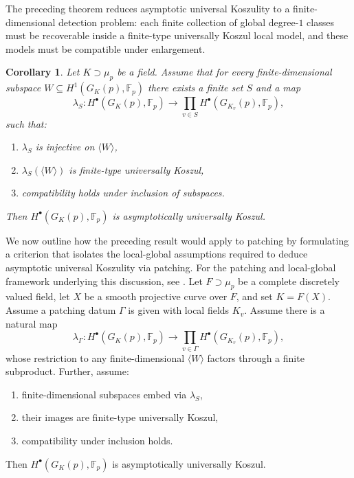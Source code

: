 \documentclass[11pt]{amsart}
\numberwithin{equation}{section}
\newtheorem{corollary}[theorem]{Corollary}
\theoremstyle{definition}
\begin{document}
	
	The preceding theorem reduces asymptotic universal Koszulity to a finite-dimensional detection problem: each finite collection of global degree-$1$ classes must be recoverable inside a finite-type universally Koszul local model, and these models must be compatible under enlargement.
	
	
	
	\begin{corollary}
		\label{cor:finite-local-product-descent}
		Let $K \supset \mu_p$ be a field. Assume that for every finite-dimensional subspace $W \subseteq H^1(G_K(p),\mathbb{F}_p)$ there exists a finite set $S$ and a map
		\[\lambda_S \colon H^\bullet(G_K(p),\mathbb{F}_p) \longrightarrow \prod_{v\in S} H^\bullet(G_{K_v}(p),\mathbb{F}_p),\]
		such that:
		\begin{enumerate}[label=(\roman*)]
			\item $\lambda_S$ is injective on $\langle W\rangle$,
			\item $\lambda_S(\langle W\rangle)$ is finite-type universally Koszul,
			\item compatibility holds under inclusion of subspaces.
		\end{enumerate}
		Then $H^\bullet(G_K(p),\mathbb F_p)$ is asymptotically universally Koszul.
	\end{corollary}
	
	We now outline how the preceding result would apply to patching by formulating a criterion that isolates the local-global assumptions required to deduce asymptotic universal Koszulity via patching. For the patching and local-global framework underlying this discussion, see \cite{HarbaterHartmannKrashenLGG,HarbaterHartmannKrashenLGcohom,HarbaterHartmannPatching}. Let $F\supset \mu_p $ be a complete discretely valued field, let $X$ be a smooth projective curve over $F$, and set $K = F(X)$. Assume a patching datum $\Gamma$ is given with local fields $K_v$. Assume there is a natural map
	\[\lambda_\Gamma \colon H^\bullet(G_K(p),\mathbb{F}_p) \longrightarrow
	\prod_{v\in \Gamma} H^\bullet(G_{K_v}(p),\mathbb{F}_p),\]
	whose restriction to any finite-dimensional $\langle W\rangle$ factors through a finite subproduct. Further, assume:
	\begin{enumerate}[label=(\roman*)]
		\item finite-dimensional subspaces embed via $\lambda_S$,
		\item their images are finite-type universally Koszul,
		\item compatibility under inclusion holds.
	\end{enumerate}
	Then $H^\bullet(G_K(p),\mathbb F_p)$ is asymptotically universally Koszul.
	
\end{document}
